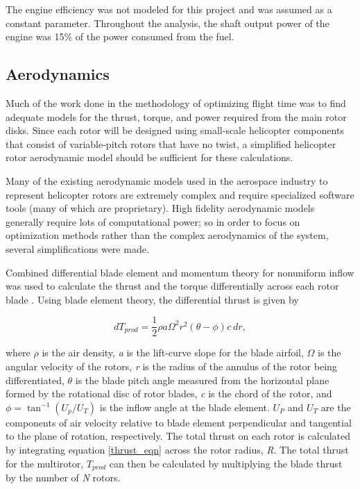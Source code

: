 \documentclass[letterpaper, 10 pt, conference]{ieeeconf}  %
\begin{document}
The engine efficiency was not modeled for this project and was assumed as a constant parameter.  Throughout the analysis, the shaft output power of the engine was 15\% of the power consumed from the fuel.  

\subsection{Aerodynamics}

Much of the work done in the methodology of optimizing flight time was to find adequate models for the thrust, torque, and power required from the main rotor disks. Since each rotor will be designed using small-scale helicopter components that consist of variable-pitch rotors that have no twist, a simplified helicopter rotor aerodynamic model should be sufficient for these calculations. 

Many of the existing aerodynamic models used in the aerospace industry to represent helicopter rotors are extremely complex and require specialized software tools (many of which are proprietary). High fidelity aerodynamic models generally require lots of computational power; so in order to focus on optimization methods rather than the complex aerodynamics of the system, several simplifications were made.

Combined differential blade element and momentum theory for nonuniform inflow was used to calculate the thrust and the torque differentially across each rotor blade \cite{bramwell2001bramwell}. Using blade element theory, the differential thrust is given by

\begin{equation}
	dT_{prod} = \frac{1}{2} \rho a \Omega^2 r^2 (\theta - \phi) c \  dr,
	\label{thrust_eqn}
\end{equation}

where $\rho$ is the air density, \textit{a} is the lift-curve slope for the blade airfoil, $\Omega$ is the angular velocity of the rotors, \textit{r} is the radius of the annulus of the rotor being differentiated, $\theta$ is the blade pitch angle measured from the horizontal plane formed by the rotational disc of rotor blades, \textit{c} is the chord of the rotor, and $\phi = \tan^{-1}(U_p/U_T) $ is the inflow angle at the blade element. $U_P$ and $U_T$ are the components of air velocity relative to blade element perpendicular and tangential to the plane of rotation, respectively. The total thrust on each rotor is calculated by integrating equation \ref{thrust_eqn} across the rotor radius, \textit{R}. The total thrust for the multirotor, $T_{prod}$ can then be calculated by multiplying the blade thrust by the number of \textit{N} rotors. 
\end{document}
